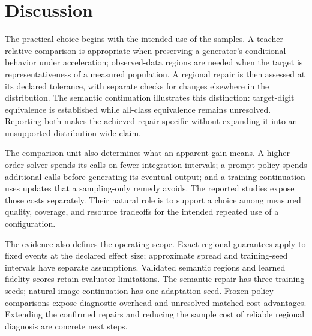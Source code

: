 \section{Discussion}
\label{sec:discussion}
The practical choice begins with the intended use of the samples. A
teacher-relative comparison is appropriate when preserving a generator's
conditional behavior under acceleration; observed-data regions are needed
when the target is representativeness of a measured population. A regional
repair is then assessed at its declared tolerance, with separate checks
for changes elsewhere in the distribution. The semantic continuation
illustrates this distinction: target-digit equivalence is established while
all-class equivalence remains unresolved. Reporting both makes the achieved
repair specific without expanding it into an unsupported distribution-wide
claim.

The comparison unit also determines what an apparent gain means. A
higher-order solver spends its calls on fewer integration intervals; a
prompt policy spends additional calls before generating its eventual output;
and a training continuation uses updates that a sampling-only remedy avoids.
The reported studies expose those costs separately. Their natural role is
to support a choice among measured quality, coverage, and resource tradeoffs
for the intended repeated use of a configuration.

The evidence also defines the operating scope. Exact regional guarantees
apply to fixed events at the declared effect size; approximate spread and
training-seed intervals have separate assumptions. Validated semantic regions
and learned fidelity scores retain evaluator limitations. The semantic repair
has three training seeds; natural-image \mbox{continuation} has one adaptation
seed. Frozen policy comparisons expose diagnostic overhead and unresolved
matched-cost advantages. Extending the confirmed repairs and reducing the
sample cost of reliable regional diagnosis are concrete next steps.
